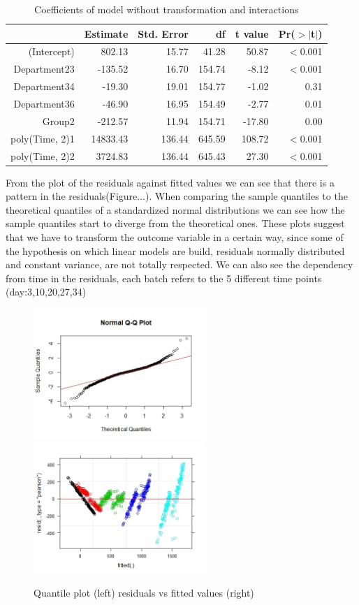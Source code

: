 \documentclass{article}
\begin{document}
\begin{table}[ht]
\centering
\caption{Coefficients of model without transformation and interactions}
\begin{tabular}{rrrrrr}
  \hline
 & Estimate & Std. Error & df & t value & Pr($>$$|$t$|$) \\ 
  \hline
(Intercept) & 802.13 & 15.77 & 41.28 & 50.87 & $<$0.001 \\ 
  Department23 & -135.52 & 16.70 & 154.74 & -8.12 & $<$0.001 \\ 
  Department34 & -19.30 & 19.01 & 154.77 & -1.02 & 0.31 \\ 
  Department36 & -46.90 & 16.95 & 154.49 & -2.77 & 0.01 \\ 
  Group2 & -212.57 & 11.94 & 154.71 & -17.80 & 0.00 \\ 
  poly(Time, 2)1 & 14833.43 & 136.44 & 645.59 & 108.72 & $<$0.001 \\ 
  poly(Time, 2)2 & 3724.83 & 136.44 & 645.43 & 27.30 & $<$0.001 \\ 
   \hline
\end{tabular}
\end{table}

From the plot of the residuals against fitted values we can see that there is a pattern in the residuals(Figure...). When comparing the sample quantiles to the theoretical quantiles of a standardized normal distributions we can see how the sample quantiles start to diverge from the theoretical ones. These plots suggest that we have to transform the outcome variable in a certain way, since some of the hypothesis on which linear models are build, residuals normally distributed and constant variance, are not totally respected.
We can also see the dependency from time in the residuals, each batch refers to the 5 different time points (day:3,10,20,27,34)
 


\begin{figure}[ht]%
    \centering
     {{\includegraphics[width=6.5cm]{qqplot_mod_poly_inter_l.jpeg} }}%
    \qquad
     {{\includegraphics[width=6.5cm]{Resid_mod_poly.jpeg} }}%
    \caption{Quantile plot (left) residuals vs fitted values (right)}%
    \label{fig:example}%
\end{figure}
\end{document}
